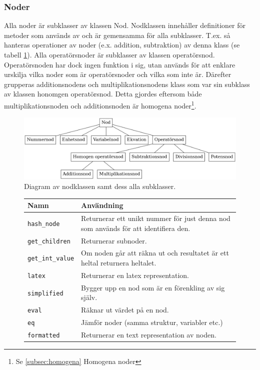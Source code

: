 \documentclass[12pt,a4paper]{article}
\begin{document}
\subsubsection{Noder}
Alla noder är subklasser av klassen Nod. Nodklassen innehåller definitioner för metoder som används av och är gemensamma för alla subklasser. T.ex. så hanteras operationer av noder (e.x. addition, subtraktion) av denna klass (se tabell \ref{tab:basenodefunc}). Alla operatörsnoder är subklasser av klassen operatörsnod. Operatörsnoden har dock ingen funktion i sig, utan används för att enklare urskilja vilka noder som är operatörsnoder och vilka som inte är. Därefter grupperas additionsnodens och multiplikationsnodens klass som var sin subklass av klassen honomgen operatörsnod. Detta gjordes eftersom både multiplikationsnoden och additionsnoden är homogena noder\footnote{Se \ref{subsec:homogena} Homogena noder}.
\begin{figure}[h!]
  \center
  \includegraphics[width=1\textwidth]{image20}
  \caption{Diagram av nodklassen samt dess alla subklasser.}
\end{figure}

\begin{figure}[h!]
  \centering
  \begin{tabular}{l|p{10cm}}
    \textbf{Namn} & \textbf{Användning} \\
    \hline
    \texttt{hash\_node} & Returnerar ett unikt nummer för just denna nod som används för att identifiera den. \\
    \texttt{get\_children} & Returnerar subnoder. \\
    \texttt{get\_int\_value} & Om noden går att räkna ut och resultatet är ett heltal returnera heltalet. \\
    \texttt{latex} & Returnerar en latex representation. \\
    \texttt{simplified} & Bygger upp en nod som är en förenkling av sig själv. \\
    \texttt{eval} & Räknar ut värdet på en nod. \\
    \texttt{eq} & Jämför noder (samma struktur, variabler etc.) \\
    \texttt{formatted} & Returnerar en text representation av noden.
  \end{tabular}
   \label{tab:basenodefunc}
\end{figure}
\end{document}

